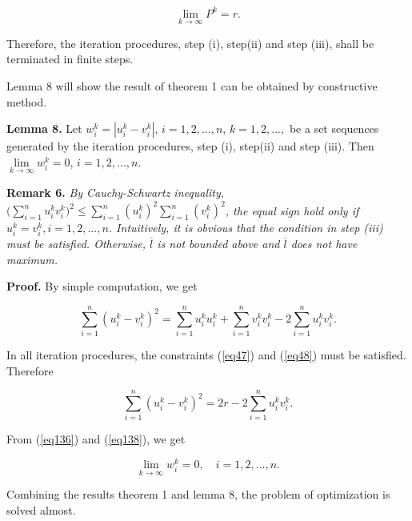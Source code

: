 \documentclass [18pt]{article}
\begin{document}
\begin{equation}
\label{eq136}
\mathop {\lim }\limits_{k \to \infty } P^k = r.
\end{equation}



Therefore, the iteration procedures, step (i), step(ii) and step (iii),
shall be terminated in finite steps.

Lemma 8 will show the result of theorem 1 can be obtained by constructive
method.

\textbf{Lemma 8.} Let $w_i^k = \left| {u_i^k - v_i^k } \right|$, $i =
1,2,...,n$, $k = 1,2,...,$ be a set sequences generated by the iteration
procedures, step (i), step(ii) and step (iii). Then $\mathop {\lim
}\limits_{k \to \infty } w_i^k = 0$, $i = 1,2,...,n$.

\textbf{Remark 6.}\textit{ By Cauchy-Schwartz inequality, }$(\sum\limits_{i = 1}^n {u_i^k v_i^k )^2 \le }
\sum\limits_{i = 1}^n {(u_i^k )^2} \sum\limits_{i = 1}^n {(v_i^k )^2} $\textit{, the equal sign hold only if }$u_i^k
= v_i^k , i = 1,2,...,n$\textit{. Intuitively, it is obvious that the condition in step (iii) must be satisfied. Otherwise, }$\overline l $\textit{ is not bounded above and }$\overline l $\textit{ does not have maximum. }

\textbf{Proof.} By simple computation, we get


\begin{equation}
\label{eq137}
\sum\limits_{i = 1}^n {(u_i^k - v_i^k )^2 = \sum\limits_{i = 1}^n {u_i^k } }
u_i^k + \sum\limits_{i = 1}^n {v_i^k } v_i^k - 2\sum\limits_{i = 1}^n {u_i^k
} v_i^k .
\end{equation}



In all iteration procedures, the constraints (\ref{eq47}) and (\ref{eq48}) must be
satisfied. Therefore


\begin{equation}
\label{eq138}
\sum\limits_{i = 1}^n {(u_i^k - v_i^k )^2 = } 2r - 2\sum\limits_{i = 1}^n
{u_i^k } v_i^k .
\end{equation}



From (\ref{eq136}) and (\ref{eq138}), we get


\begin{equation}
\label{eq139}
\mathop {\lim }\limits_{k \to \infty } w_i^k = 0,
\quad
i = 1,2,...,n.
\end{equation}



Combining the results theorem 1 and lemma 8, the problem of optimization is
solved almost.
\end{document}
